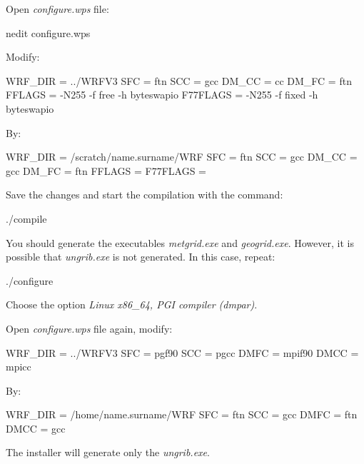 \noindent Open \textit{configure.wps} file:
\bigskip

\begin{bashcode}
nedit configure.wps
\end{bashcode}
\bigskip

\noindent Modify:
\bigskip

\begin{bashcode}
WRF_DIR  = ../WRFV3
SFC      = ftn
SCC      = gcc
DM_CC    = cc
DM_FC    = ftn
FFLAGS   = -N255 -f free -h byteswapio
F77FLAGS = -N255 -f fixed -h byteswapio

\end{bashcode}
\bigskip

\noindent By:
\bigskip

\begin{bashcode}
WRF_DIR  = /scratch/name.surname/WRF
SFC      = ftn
SCC      = gcc
DM_CC    = gcc
DM_FC    = ftn
FFLAGS   =
F77FLAGS =
\end{bashcode}
\bigskip

\noindent Save the changes and start the compilation with the command:
\bigskip

\begin{bashcode}
./compile
\end{bashcode}
\bigskip

\noindent You should generate the executables \textit{metgrid.exe} and \textit{geogrid.exe}. However, it is possible that \textit{ungrib.exe} 
is not generated. In this case, repeat:
\bigskip

\begin{bashcode}
./configure
\end{bashcode}
\bigskip

\noindent Choose the option \textit{Linux x86\_64, PGI compiler (dmpar)}.
\bigskip

\noindent Open \textit{configure.wps} file again, modify:
\bigskip

\begin{bashcode}
WRF_DIR = ../WRFV3
SFC     = pgf90
SCC     = pgcc
DMFC    = mpif90
DMCC    = mpicc
\end{bashcode}
\bigskip

\noindent By:
\bigskip

\begin{bashcode}
WRF_DIR = /home/name.surname/WRF
SFC     = ftn
SCC     = gcc
DMFC    = ftn
DMCC    = gcc
\end{bashcode}
\bigskip

\noindent The installer will generate only the \textit{ungrib.exe}.


